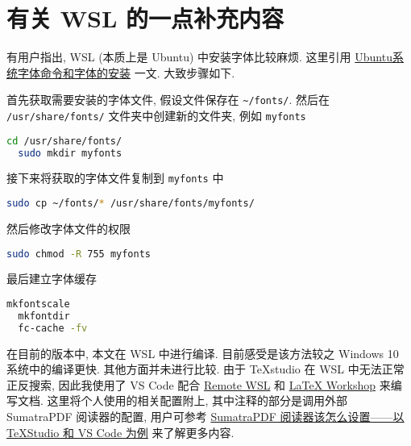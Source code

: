 
\chapter{有关 WSL 的一点补充内容}\label{chp:appendix:wsl}

有用户指出,
WSL (本质上是 Ubuntu) 中安装字体比较麻烦.
这里引用
\href{https://www.jianshu.com/p/e7f12b8c8602}{Ubuntu系统字体命令和字体的安装}
一文.
大致步骤如下.

首先获取需要安装的字体文件,
假设文件保存在 \verb|~/fonts/|.
然后在 \texttt{/usr/share/fonts/} 文件夹中创建新的文件夹,
例如 \texttt{myfonts}
\begin{lstlisting}[language=bash]
  cd /usr/share/fonts/
  sudo mkdir myfonts
\end{lstlisting}
接下来将获取的字体文件复制到 \texttt{myfonts} 中
\begin{lstlisting}[language=bash]
  sudo cp ~/fonts/* /usr/share/fonts/myfonts/ 
\end{lstlisting}
然后修改字体文件的权限
\begin{lstlisting}[language=bash]
  sudo chmod -R 755 myfonts
\end{lstlisting}
最后建立字体缓存
\begin{lstlisting}[language=bash]
  mkfontscale
  mkfontdir
  fc-cache -fv
\end{lstlisting}

在目前的版本中, 本文在 WSL 中进行编译.
目前感受是该方法较之 Windows 10 系统中的编译更快.
其他方面并未进行比较.
由于 \TeX studio 在 WSL 中无法正常正反搜索,
因此我使用了 VS Code 配合
\href{https://marketplace.visualstudio.com/items?itemName=ms-vscode-remote.remote-wsl}{Remote WSL}
和
\href{https://marketplace.visualstudio.com/items?itemName=James-Yu.latex-workshop}{\LaTeX{} Workshop}
来编写文档.
这里将个人使用的相关配置附上,
其中注释的部分是调用外部 SumatraPDF 阅读器的配置,
用户可参考
\href{https://wenda.latexstudio.net/article-5055.html}{SumatraPDF 阅读器该怎么设置——以 TeXStudio 和 VS Code 为例}%
来了解更多内容.

